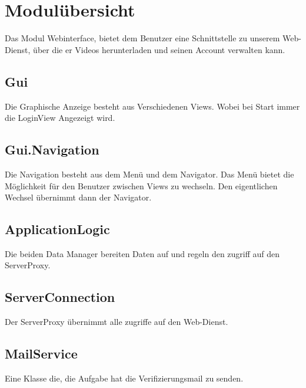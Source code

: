 \section{Modulübersicht} \label{interface:modul}
Das Modul Webinterface, bietet dem Benutzer eine Schnittstelle zu unserem Web-Dienst, über die er Videos herunterladen und seinen Account verwalten kann. 

\subsection{Gui}
Die Graphische Anzeige besteht aus Verschiedenen Views. Wobei bei Start immer die LoginView Angezeigt wird.

\subsection{Gui.Navigation}
Die Navigation besteht aus dem Menü und dem Navigator. Das Menü bietet die Möglichkeit für den Benutzer zwischen Views zu wechseln. Den eigentlichen Wechsel übernimmt dann der Navigator.

\subsection{ApplicationLogic}
Die beiden Data Manager bereiten Daten auf und regeln den zugriff auf den ServerProxy.

\subsection{ServerConnection}
Der ServerProxy übernimmt alle zugriffe auf den Web-Dienst.

\subsection{MailService}
Eine Klasse die, die Aufgabe hat die Verifizierungsmail zu senden.
\newpage